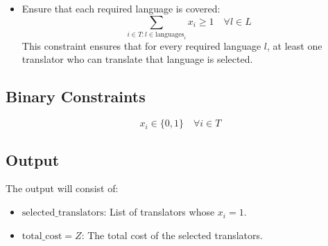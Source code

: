 \documentclass{article}
\begin{document}
\begin{itemize}
    \item Ensure that each required language is covered:
    \[
    \sum_{i \in T : l \in \text{languages}_i} x_i \geq 1 \quad \forall l \in L
    \]
    This constraint ensures that for every required language \( l \), at least one translator who can translate that language is selected.
\end{itemize}

\subsection*{Binary Constraints}
\[
x_i \in \{0, 1\} \quad \forall i \in T
\]

\subsection*{Output}
The output will consist of:
\begin{itemize}
    \item \( \text{selected\_translators} \): List of translators whose \( x_i = 1 \).
    \item \( \text{total\_cost} = Z \): The total cost of the selected translators.
\end{itemize}
\end{document}
